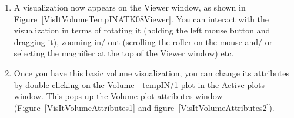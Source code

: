\begin{enumerate}

\item A visualization now appears on the Viewer window, as shown in
  Figure~\ref{VisItVolumeTempINATK08Viewer}. You can interact with the
  visualization in terms of rotating it (holding the left mouse button
  and dragging it), zooming in/ out (scrolling the roller on the mouse
  and/ or selecting the magnifier at the top of the Viewer window)
  etc.




\item Once you have this basic volume visualization, you can change
  its attributes by double clicking on the Volume - tempIN/1 plot in
  the Active plots window. This pops up the Volume plot attributes
  window (Figure~\ref{VisItVolumeAttributes1} and
  figure~\ref{VisItVolumeAttributes2}).


\end{enumerate}


\begin{figure}[h]
  \centering
  \vspace{-10pt}
  \hspace{10pt}
  \hspace{10pt}
  \caption{}
  \vspace{-10pt}
  \label{}
\end{figure}

